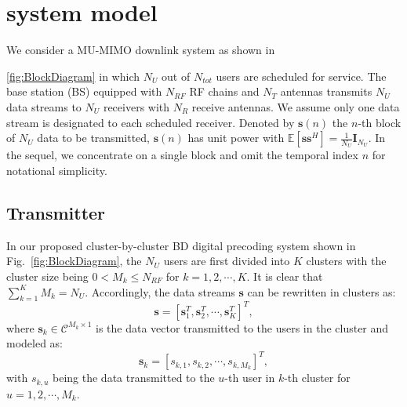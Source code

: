 \documentclass[conference]{IEEEtran}
\begin{document}
\section{system model}
We consider a MU-MIMO downlink system as shown in \figurename{\ref{fig:BlockDiagram} in which $N_U$ out of $N_{tot}$ users are scheduled for service. The base station (BS) equipped with $N_{RF}$ RF chains and $N_T$ antennas transmits $N_U$ data streams to $N_U$ receivers with $N_R$ receive antennas. We assume only one data stream is designated to each scheduled receiver. Denoted by ${\bm s}(n)$ the $n$-th block of $N_U$ data to be transmitted, ${\bm s}(n)$ has unit power with $\mathbb{E}\left[\bm{ss}^H\right]=\frac{1}{N_U}\bm{I}_{N_U}$. In the sequel, we concentrate on a single block and omit the temporal index $n$ for notational simplicity.

\subsection{Transmitter}
In our proposed cluster-by-cluster BD digital precoding system shown in Fig.~\ref{fig:BlockDiagram}, the $N_U$ users are first divided into $K$ clusters with the cluster size being $0< M_k\leq N_{RF}$ for $k=1,2,\cdots,K$. It is clear that $\displaystyle\sum_{k=1}^{K} M_k = N_U$. Accordingly, the data streams $\bm{s}$ can be rewritten in clusters as:
\begin{equation}
\bm{s} = \left[{\mathbf{s}}_1^T, {\mathbf{s}}_2^T,\cdots, \mathbf{s}_{K}^T\right]^T,
\end{equation}
where $\mathbf{s}_k\in \mathcal{C}^{M_k\times 1}$ is the data vector transmitted to the users in the  cluster and modeled as:
\begin{equation}
\mathbf{s}_k = \left[s_{k,1}, s_{k,2},\cdots, s_{k,M_k}\right]^T,
\end{equation}
with $s_{k,u}$ being the data transmitted to the $u$-th user in $k$-th cluster for $u=1,2,\cdots,M_k$.

}
\end{document}

